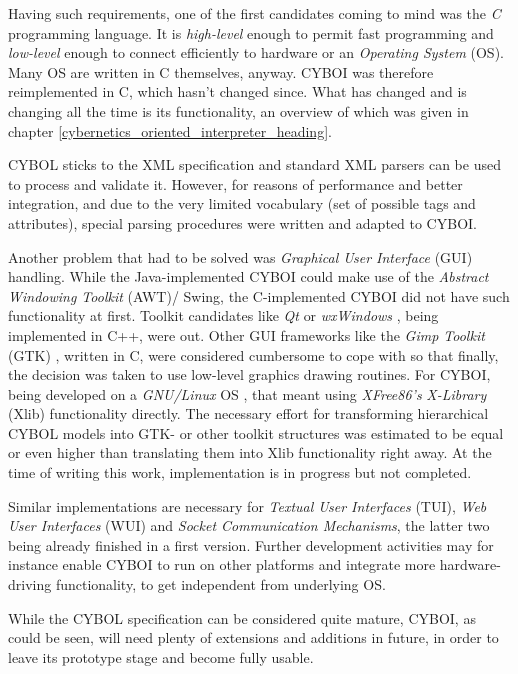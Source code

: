 Having such requirements, one of the first candidates coming to mind was the
\emph{C} programming language. It is \emph{high-level} enough to permit fast
programming and \emph{low-level} enough to connect efficiently to hardware or
an \emph{Operating System} (OS). Many OS are written in C themselves, anyway.
CYBOI was therefore reimplemented in C, which hasn't changed since. What has
changed and is changing all the time is its functionality, an overview of which
was given in chapter \ref{cybernetics_oriented_interpreter_heading}.

CYBOL sticks to the XML specification and standard XML parsers can be used to
process and validate it. However, for reasons of performance and better
integration, and due to the very limited vocabulary (set of possible tags and
attributes), special parsing procedures were written and adapted to CYBOI.

Another problem that had to be solved was \emph{Graphical User Interface} (GUI)
handling. While the Java-implemented CYBOI could make use of the
\emph{Abstract Windowing Toolkit} (AWT)/ Swing, the C-implemented CYBOI did not
have such functionality at first. Toolkit candidates like \emph{Qt} \cite{qt}
or \emph{wxWindows} \cite{wxwidgets}, being implemented in C++, were out. Other
GUI frameworks like the \emph{Gimp Toolkit} (GTK) \cite{gtk}, written in C,
were considered cumbersome to cope with so that finally, the decision was taken
to use low-level graphics drawing routines. For CYBOI, being developed on a
\emph{GNU/Linux} OS \cite{linux}, that meant using \emph{XFree86's}
\cite{xfree86} \emph{X-Library} (Xlib) functionality directly. The necessary
effort for transforming hierarchical CYBOL models into GTK- or other toolkit
structures was estimated to be equal or even higher than translating them into
Xlib functionality right away. At the time of writing this work, implementation
is in progress but not completed.

Similar implementations are necessary for \emph{Textual User Interfaces} (TUI),
\emph{Web User Interfaces} (WUI) and \emph{Socket Communication Mechanisms},
the latter two being already finished in a first version. Further development
activities may for instance enable CYBOI to run on other platforms and integrate
more hardware-driving functionality, to get independent from underlying OS.

While the CYBOL specification can be considered quite mature, CYBOI, as could
be seen, will need plenty of extensions and additions in future, in order to
leave its prototype stage and become fully usable.
